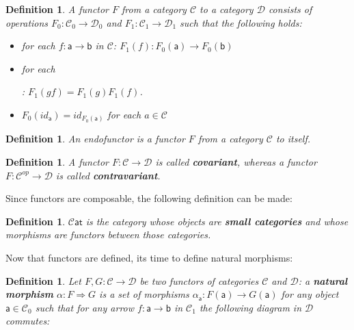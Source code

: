 \documentclass{article}
\newcommand{\cat}[1]{\mathcal{#1}} %
\newcommand{\cato}[1]{\cat{#1}_0} %
\newcommand{\catm}[1]{\cat{#1}_1} %
\newcommand{\ob}[1]{\mathsf{#1}} %
\newcommand{\scat}{\cat{C}\ob{at}}
\newcommand{\catop}[1]{\cat{#1}^{op}}
\newtheorem{definition}[theorem]{Definition}
\begin{document}
\begin{definition}
	A functor $F$ from a category $\cat{C}$ to a category $\cat{D}$ consists of operations $F_0: \cato{C} \rightarrow \cato{D}$ and $F_1: \catm{C} \rightarrow \catm{D}$ such that the following holds:
	\begin{itemize}
			\item for each $f: \ob{a} \rightarrow \ob{b}$ in $\cat{C}$: $F_1(f): F_0(\ob{a}) \rightarrow F_0(\ob{b})$
			\item for each
			: $F_1(gf) = F_1(g)F_1(f)$.
			\item $F_0(id_{\ob{a}}) = id_{F_0(\ob{a})}$ for each $a \in \cat{C}$
	\end{itemize}
\end{definition}

\begin{definition}
	An endofunctor is a functor $F$ from a category $\cat{C}$ to itself.
\end{definition}

\begin{definition}
	A functor $F: \cat{C} \rightarrow \cat{D}$ is called \textbf{covariant}, whereas a functor $F: \catop{C} \rightarrow \cat{D}$ is called \textbf{contravariant}.
\end{definition}

Since functors are composable, the following definition can be made:

\begin{definition}
	$\scat$ is the category whose objects are \textbf{small categories} and whose morphisms are functors between those categories.
\end{definition}

Now that functors are defined, its time to define natural morphisms:

\begin{definition}
	Let $F, G: \cat{C} \rightarrow \cat{D}$ be two functors of categories $\cat{C}$ and $\cat{D}$: a \textbf{natural morphism} $\alpha: F \Rightarrow G$ is a set of morphisms
	$\alpha_{\ob{a}}: F(\ob{a}) \rightarrow G(\ob{a})$ for any object $\ob{a} \in \cato{C}$ such that for any arrow $f: \ob{a} \rightarrow \ob{b}$ in $\catm{C}$ the following diagram in $\cat{D}$ commutes:

\end{definition}
\end{document}
